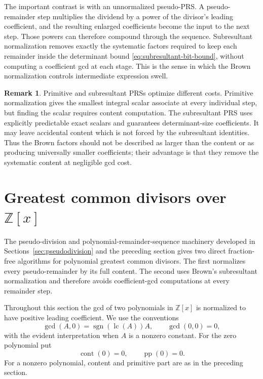 \documentclass[11pt]{book}
\theoremstyle{definition}
\newtheorem{remark}[theorem]{Remark}
\newcommand{\ZZ}{\mathbb Z}
\begin{document}
The important contrast is with an unnormalized pseudo-PRS.  A pseudo-remainder
step multiplies the dividend by a power of the divisor's leading coefficient,
and the resulting enlarged coefficients become the input to the next step.
Those powers can therefore compound through the sequence.  Subresultant
normalization removes exactly the systematic factors required to keep each
remainder inside the determinant bound
\eqref{eq:subresultant-bit-bound}, without computing a coefficient gcd at
each stage.  This is the sense in which the Brown normalization controls
intermediate expression swell.

\begin{remark}
Primitive and subresultant PRSs optimize different costs.  Primitive
normalization gives the smallest integral scalar associate at every individual
step, but finding the scalar requires content computation.  The subresultant
PRS uses explicitly predictable exact scalars and guarantees determinant-size
coefficients.  It may leave accidental content which is not forced by the
subresultant identities.  Thus the Brown factors should not be described as
larger than the content or as producing universally smaller coefficients;
their advantage is that they remove the systematic content at negligible gcd
cost.
\end{remark}




\section{Greatest common divisors over $\ZZ[x]$}\label{sec:zz-poly-gcd}

The pseudo-division and polynomial-remainder-sequence machinery developed in
Sections~\ref{sec:pseudodivision} and the preceding section gives two direct
fraction-free algorithms for polynomial greatest common divisors.  The first
normalizes every pseudo-remainder by its full content.  The second uses Brown's
subresultant normalization and therefore avoids coefficient-gcd computations at
every remainder step.

Throughout this section the gcd of two polynomials in $\ZZ[x]$ is normalized to
have positive leading coefficient.  We use the conventions
\[
 \gcd(A,0)=\operatorname{sgn}(\operatorname{lc}(A))A,
 \qquad
 \gcd(0,0)=0,
\]
with the evident interpretation when $A$ is a nonzero constant.  For the zero
polynomial put
\[
 \operatorname{cont}(0)=0,
 \qquad
 \operatorname{pp}(0)=0.
\]
For a nonzero polynomial, content and primitive part are as in the preceding
section.
\end{document}
